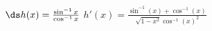 {$\ds h(x) = \frac{\sin^{-1}x}{\cos^{-1}x}$
}
{$h'(x)=\frac{\sin ^{-1}(x)+\cos ^{-1}(x)}{\sqrt{1-x^2} \cos ^{-1}(x)^2}$
}
